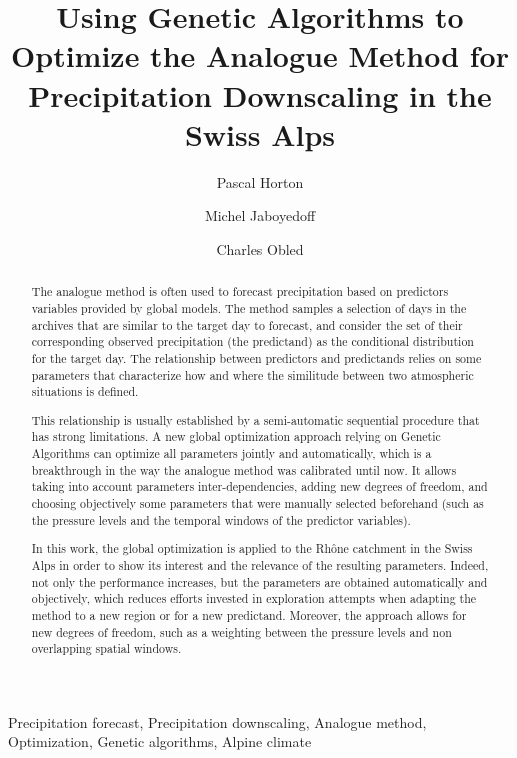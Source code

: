 \documentclass[5p]{elsarticle}
\begin{document}
\begin{frontmatter}

\title{Using Genetic Algorithms to Optimize the Analogue Method for Precipitation Downscaling in the Swiss Alps}

\author[unil,terranum]{Pascal Horton}

\author[unil]{Michel Jaboyedoff}
\author[lthe]{Charles Obled}

\address[unil]{University of Lausanne, Lausanne, Switzerland}
\address[terranum]{Terranum, Rue de l'industrie 35 bis, 1030 Bussigny, Switzerland}
\address[lthe]{Universit\'{e} de Grenoble-Alpes, LTHE, Grenoble, France}

\begin{abstract}
The analogue method is often used to forecast precipitation based on predictors variables provided by global models. The method samples a selection of days in the archives that are similar to the target day to forecast, and consider the set of their corresponding observed precipitation (the predictand) as the conditional distribution for the target day. The relationship between predictors and predictands relies on some parameters that characterize how and where the similitude between two atmospheric situations is defined.

This relationship is usually established by a semi-automatic sequential procedure that has strong limitations. A new global optimization approach relying on Genetic Algorithms can optimize all parameters jointly and automatically, which is a breakthrough in the way the analogue method was calibrated until now. It allows taking into account parameters inter-dependencies, adding new degrees of freedom, and choosing objectively some parameters that were manually selected beforehand (such as the pressure levels and the temporal windows of the predictor variables).

In this work, the global optimization is applied to the Rh\^{o}ne catchment in the Swiss Alps in order to show its interest and the relevance of the resulting parameters. Indeed, not only the performance increases, but the parameters are obtained automatically and objectively, which reduces efforts invested in exploration attempts when adapting the method to a new region or for a new predictand. Moreover, the approach allows for new degrees of freedom, such as a weighting between the pressure levels and non overlapping spatial windows.
\end{abstract}

\begin{keyword}
Precipitation forecast\sep
Precipitation downscaling\sep
Analogue method\sep
Optimization\sep
Genetic algorithms\sep
Alpine climate
\end{keyword}

\end{frontmatter}
\end{document}
